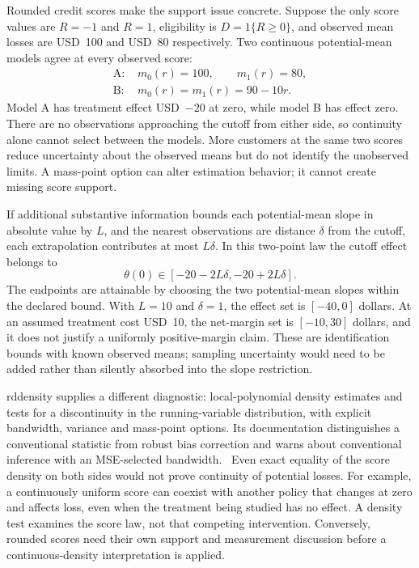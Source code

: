 Rounded credit scores make the support issue concrete. Suppose the only score
values are $R=-1$ and $R=1$, eligibility is $D=1\{R\geq0\}$, and observed mean
losses are USD~100 and USD~80 respectively. Two continuous potential-mean models
agree at every observed score:
\begin{align}
 \text{A: }&m_0(r)=100,\qquad m_1(r)=80,\nonumber\\
 \text{B: }&m_0(r)=m_1(r)=90-10r.
 \label{exec22:riv-support}
\end{align}
Model A has treatment effect USD~$-20$ at zero, while model B has effect zero.
There are no observations approaching the cutoff from either side, so continuity
alone cannot select between the models. More customers at the same two scores
reduce uncertainty about the observed means but do not identify the unobserved
limits. A mass-point option can alter estimation behavior; it cannot create
missing score support.~\citep{exec22_riv_reference,exec22_riv_rdrobust}

If additional substantive information bounds each potential-mean slope in
absolute value by $L$, and the nearest observations are distance $\delta$ from
the cutoff, each extrapolation contributes at most $L\delta$. In this
two-point law the cutoff effect belongs to
\begin{equation}
 \theta(0)\in[-20-2L\delta,-20+2L\delta].
 \label{exec22:riv-bound}
\end{equation}
The endpoints are attainable by choosing the two potential-mean slopes within
the declared bound. With $L=10$ and $\delta=1$, the effect set is
$[-40,0]$ dollars. At an assumed treatment cost USD~10, the net-margin set is
$[-10,30]$ dollars, and it does not justify a uniformly positive-margin claim.
These are identification bounds with known observed means; sampling uncertainty
would need to be added rather than silently absorbed into the slope restriction.

rddensity supplies a different diagnostic: local-polynomial density estimates
and tests for a discontinuity in the running-variable distribution, with explicit
bandwidth, variance and mass-point options. Its documentation distinguishes a
conventional statistic from robust bias correction and warns about conventional
inference with an MSE-selected bandwidth.~\citep{exec22_riv_rddensity}
Even exact equality of the score density on both sides would not prove continuity
of potential losses. For example, a continuously uniform score can coexist with
another policy that changes at zero and affects loss, even when the treatment
being studied has no effect. A density test examines the score law, not that
competing intervention. Conversely, rounded scores need their own support and
measurement discussion before a continuous-density interpretation is applied.

